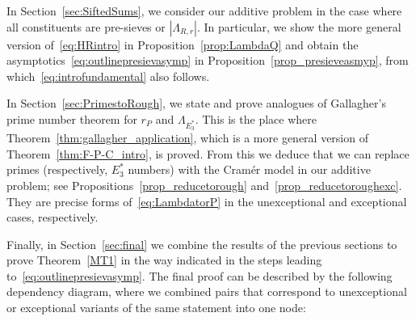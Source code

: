 \documentclass[12pt]{amsart}
\theoremstyle{definition}
\theoremstyle{remark}
\numberwithin{equation}{section}
\newcommand{\1}{\mathbf{1}}
\begin{document}
In Section~\ref{sec:SiftedSums}, we consider our additive problem in the case where all constituents are pre-sieves or $|\Lambda_{R,r}|$. In particular, we show the more general version of~\eqref{eq:HRintro} in Proposition~\ref{prop:LambdaQ} and obtain the asymptotics~\eqref{eq:outlinepresievasymp} in Proposition~\ref{prop_presieveasmyp}, from which~\eqref{eq:introfundamental} also follows. 

In Section~\ref{sec:PrimestoRough}, we state and prove analogues of Gallagher's prime number theorem for $r_P$ and $\Lambda_{E_3^{*}}$. This is the place where Theorem~\ref{thm:gallagher_application}, which is a more general version of Theorem~\ref{thm:F-P-C_intro}, is proved. From this we deduce that we can replace primes (respectively, $E_3^*$ numbers) with the Cram\'er model in our additive problem; see Propositions~\ref{prop_reducetorough} and~\ref{prop_reducetoroughexc}. They are precise forms of~\eqref{eq:LambdatorP} in the unexceptional and exceptional cases, respectively. 

Finally, in Section~\ref{sec:final} we combine the results of the previous sections to prove Theorem~\ref{MT1} in the way indicated in the steps leading to~\eqref{eq:outlinepresievasymp}. The final proof can be described by the following dependency diagram, where we combined pairs that correspond to unexceptional or exceptional variants of the same statement into one node:

\vspace{1cm}
\end{document}
